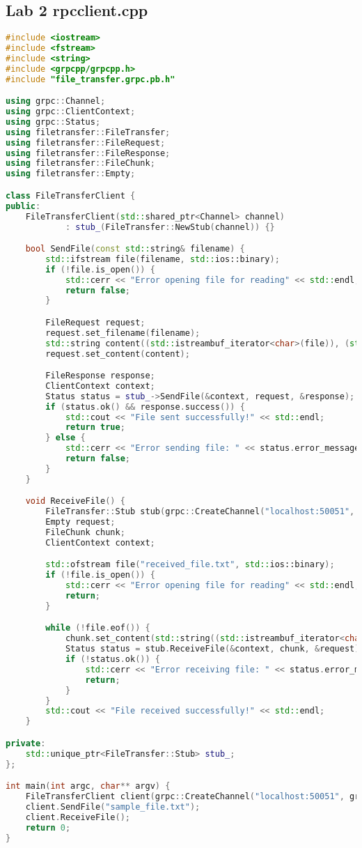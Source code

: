 \documentclass{article}
\begin{document}
\subsection{Lab 2 rpcclient.cpp}
\begin{lstlisting}[language=C++, caption=client C++ Code, label=lst:code]
#include <iostream>
#include <fstream>
#include <string>
#include <grpcpp/grpcpp.h>
#include "file_transfer.grpc.pb.h"

using grpc::Channel;
using grpc::ClientContext;
using grpc::Status;
using filetransfer::FileTransfer;
using filetransfer::FileRequest;
using filetransfer::FileResponse;
using filetransfer::FileChunk;
using filetransfer::Empty;

class FileTransferClient {
public:
    FileTransferClient(std::shared_ptr<Channel> channel)
            : stub_(FileTransfer::NewStub(channel)) {}

    bool SendFile(const std::string& filename) {
        std::ifstream file(filename, std::ios::binary);
        if (!file.is_open()) {
            std::cerr << "Error opening file for reading" << std::endl;
            return false;
        }

        FileRequest request;
        request.set_filename(filename);
        std::string content((std::istreambuf_iterator<char>(file)), (std::istreambuf_iterator<char>()));
        request.set_content(content);

        FileResponse response;
        ClientContext context;
        Status status = stub_->SendFile(&context, request, &response);
        if (status.ok() && response.success()) {
            std::cout << "File sent successfully!" << std::endl;
            return true;
        } else {
            std::cerr << "Error sending file: " << status.error_message() << std::endl;
            return false;
        }
    }

    void ReceiveFile() {
        FileTransfer::Stub stub(grpc::CreateChannel("localhost:50051", grpc::InsecureChannelCredentials()));
        Empty request;
        FileChunk chunk;
        ClientContext context;

        std::ofstream file("received_file.txt", std::ios::binary);
        if (!file.is_open()) {
            std::cerr << "Error opening file for reading" << std::endl;
            return;
        }

        while (!file.eof()) {
            chunk.set_content(std::string((std::istreambuf_iterator<char>(file)), (std::istreambuf_iterator<char>())));
            Status status = stub.ReceiveFile(&context, chunk, &request);
            if (!status.ok()) {
                std::cerr << "Error receiving file: " << status.error_message() << std::endl;
                return;
            }
        }
        std::cout << "File received successfully!" << std::endl;
    }

private:
    std::unique_ptr<FileTransfer::Stub> stub_;
};

int main(int argc, char** argv) {
    FileTransferClient client(grpc::CreateChannel("localhost:50051", grpc::InsecureChannelCredentials()));
    client.SendFile("sample_file.txt");
    client.ReceiveFile();
    return 0;
}
\end{lstlisting}
\end{document}
